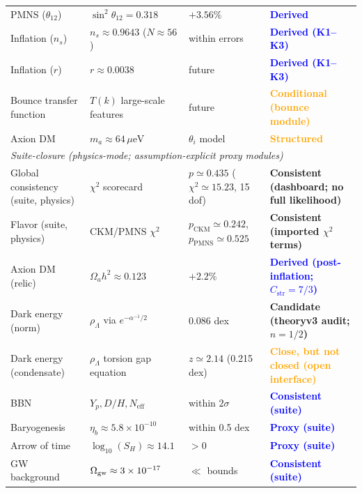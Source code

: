 \begin{longtable}{@{}p{3cm}p{4cm}p{3cm}p{5.2cm}@{}}
\quad PMNS ($\theta_{12}$) & $\sin^2\theta_{12} = \num[round-mode=places,round-precision=3]{0.318}$ & $+3.56\%$ & \textcolor{blue}{\textbf{Derived}}\\
\quad Inflation ($n_s$) & $n_s \approx 0.9643$ ($N\approx 56$) & within errors & \textcolor{blue}{\textbf{Derived (K1--K3)}}\\
\quad Inflation ($r$) & $r \approx 0.0038$ & future & \textcolor{blue}{\textbf{Derived (K1--K3)}}\\
\quad Bounce transfer function & $T(k)$ large-scale features & future & \textcolor{orange}{\textbf{Conditional (bounce module)}}\\
\quad Axion DM & $m_a \approx 64\,\mu\text{eV}$ & $\theta_i$ model & \textcolor{orange}{\textbf{Structured}}\\
\midrule
\multicolumn{4}{l}{\textit{Suite-closure (physics-mode; assumption-explicit proxy modules)}}\\
\quad Global consistency (suite, physics) & $\chi^2$ scorecard & $p\simeq 0.435$ ($\chi^2\simeq 15.23$, 15 dof) & \textcolor{green!60!black}{\textbf{Consistent (dashboard; no full likelihood)}}\\
\quad Flavor (suite, physics) & CKM/PMNS $\chi^2$ & $p_{\mathrm{CKM}}\simeq 0.242$, $p_{\mathrm{PMNS}}\simeq 0.525$ & \textcolor{green!60!black}{\textbf{Consistent (imported $\chi^2$ terms)}}\\
\quad Axion DM (relic) & $\Omega_a h^2 \approx 0.123$ & $+2.2\%$ & \textcolor{blue}{\textbf{Derived (post-inflation; $C_{\mathrm{str}}=7/3$)}}\\
\quad Dark energy (norm) & $\rho_\Lambda$ via $e^{-\alpha^{-1}/2}$ & 0.086 dex & \textcolor{green!60!black}{\textbf{Candidate (theoryv3 audit; $n=1/2$)}}\\
\quad Dark energy (condensate) & $\rho_\Lambda$ torsion gap equation & $z\simeq 2.14$ (0.215 dex) & \textcolor{orange}{\textbf{Close, but not closed (open interface)}}\\
\quad BBN & $Y_p, D/H, N_\mathrm{eff}$ & within $2\sigma$ & \textcolor{blue}{\textbf{Consistent (suite)}}\\
\quad Baryogenesis & $\eta_b \approx 5.8\times10^{-10}$ & within 0.5 dex & \textcolor{blue}{\textbf{Proxy (suite)}}\\
\quad Arrow of time & $\log_{10}(S_H)\approx 14.1$ & $>0$ & \textcolor{blue}{\textbf{Proxy (suite)}}\\
\quad GW background & $\Omega_{\rm gw}\approx 3\times10^{-17}$ & $\ll$ bounds & \textcolor{blue}{\textbf{Consistent (suite)}}\\

\end{longtable}
